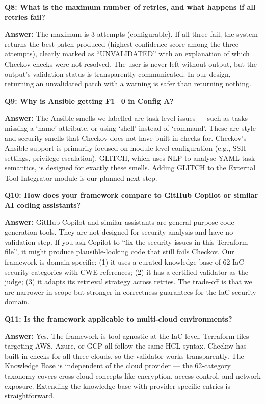 \documentclass[12pt,a4paper]{article}
\begin{document}
\begin{qabox}
\textbf{Q8: What is the maximum number of retries, and what happens if all retries fail?}

\textbf{Answer:} The maximum is 3 attempts (configurable). If all three fail, the system returns the best patch produced (highest confidence score among the three attempts), clearly marked as ``UNVALIDATED'' with an explanation of which Checkov checks were not resolved. The user is never left without output, but the output's validation status is transparently communicated. In our design, returning an unvalidated patch with a warning is safer than returning nothing.
\end{qabox}

\begin{qabox}
\textbf{Q9: Why is Ansible getting F1=0 in Config A?}

\textbf{Answer:} The Ansible smells we labelled are task-level issues --- such as tasks missing a `name' attribute, or using `shell' instead of `command'. These are style and security smells that Checkov does not have built-in checks for. Checkov's Ansible support is primarily focused on module-level configuration (e.g., SSH settings, privilege escalation). GLITCH, which uses NLP to analyse YAML task semantics, is designed for exactly these smells. Adding GLITCH to the External Tool Integrator module is our planned next step.
\end{qabox}

\begin{qabox}
\textbf{Q10: How does your framework compare to GitHub Copilot or similar AI coding assistants?}

\textbf{Answer:} GitHub Copilot and similar assistants are general-purpose code generation tools. They are not designed for security analysis and have no validation step. If you ask Copilot to ``fix the security issues in this Terraform file'', it might produce plausible-looking code that still fails Checkov. Our framework is domain-specific: (1) it uses a curated knowledge base of 62 IaC security categories with CWE references; (2) it has a certified validator as the judge; (3) it adapts its retrieval strategy across retries. The trade-off is that we are narrower in scope but stronger in correctness guarantees for the IaC security domain.
\end{qabox}

\begin{qabox}
\textbf{Q11: Is the framework applicable to multi-cloud environments?}

\textbf{Answer:} Yes. The framework is tool-agnostic at the IaC level. Terraform files targeting AWS, Azure, or GCP all follow the same HCL syntax. Checkov has built-in checks for all three clouds, so the validator works transparently. The Knowledge Base is independent of the cloud provider --- the 62-category taxonomy covers cross-cloud concepts like encryption, access control, and network exposure. Extending the knowledge base with provider-specific entries is straightforward.
\end{qabox}
\end{document}
